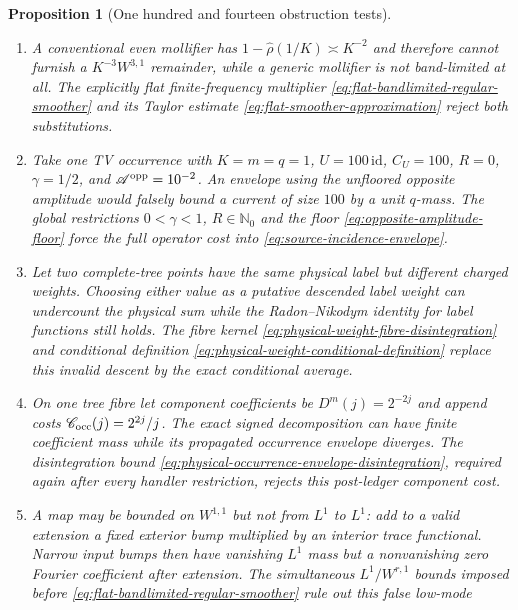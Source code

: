 \documentclass[11pt]{article}
\newtheorem{proposition}[theorem]{Proposition}
\begin{document}
\begin{proposition}[One hundred and fourteen obstruction tests]
\begin{enumerate}[label=\textup{(T\arabic*)}]
      the signed recombination identity
      \eqref{eq:physical-occurrence-signed-recombination} fix its scale
      before the Markov occurrence kernel is applied.
\item A conventional even mollifier has
      $1-\widehat\rho(1/K)\asymp K^{-2}$ and therefore cannot furnish a
      $K^{-3}W^{3,1}$ remainder, while a generic mollifier is not
      band-limited at all.  The explicitly flat finite-frequency multiplier
      \eqref{eq:flat-bandlimited-regular-smoother} and its Taylor estimate
      \eqref{eq:flat-smoother-approximation} reject both substitutions.
\item Take one TV occurrence with $K=m=q=1$, $U=100\,\mathrm{id}$,
      $C_U=100$, $R=0$, $\gamma=1/2$, and
      $\mathscr A^{\rm opp}=10^{-2}$.  An envelope using the unfloored
      opposite amplitude would falsely bound a current of size $100$ by a
      unit $q$-mass.  The global restrictions $0<\gamma<1$, $R\in\mathbb N_0$
      and the floor \eqref{eq:opposite-amplitude-floor} force the full
      operator cost into \eqref{eq:source-incidence-envelope}.
\item Let two complete-tree points have the same physical label but different
      charged weights.  Choosing either value as a putative descended label
      weight can undercount the physical sum while the Radon--Nikodym identity
      for label functions still holds.  The fibre kernel
      \eqref{eq:physical-weight-fibre-disintegration} and conditional
      definition \eqref{eq:physical-weight-conditional-definition} replace
      this invalid descent by the exact conditional average.
\item On one tree fibre let component coefficients be
      $D^m(j)=2^{-2j}$ and append costs
      $\mathscr C_{\rm occ}(j)=2^{2j}/j$.  The exact signed decomposition can
      have finite coefficient mass while its propagated occurrence envelope
      diverges.  The disintegration bound
      \eqref{eq:physical-occurrence-envelope-disintegration}, required again
      after every handler restriction, rejects this post-ledger component
      cost.
\item A map may be bounded on $W^{1,1}$ but not from $L^1$ to $L^1$: add to a
      valid extension a fixed exterior bump multiplied by an interior trace
      functional.  Narrow input bumps then have vanishing $L^1$ mass but a
      nonvanishing zero Fourier coefficient after extension.  The simultaneous
      $L^1/W^{r,1}$ bounds imposed before
      \eqref{eq:flat-bandlimited-regular-smoother} rule out this false low-mode

\end{enumerate}
\end{proposition}
\end{document}
